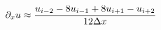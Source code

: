 \documentclass[preview]{standalone}
\begin{document}
\begin{align*}
\special{dvisvgm:raw <g id='unique000'>}\partial_x u \approx \frac{u_{i-2}-8u_{i-1}+8u_{i+1}-u_{i+2}}{12\Delta x}\special{dvisvgm:raw </g>}
\end{align*}
\end{document}
